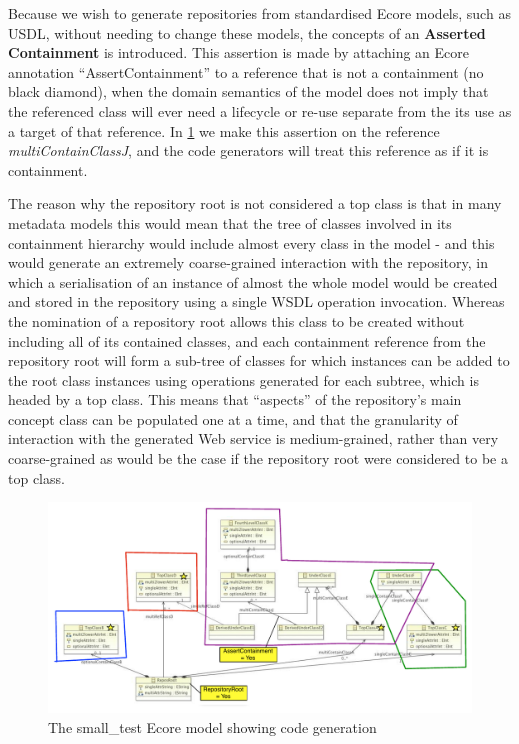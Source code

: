 \documentclass[11pt]{article}
\begin{document}
Because we wish to generate repositories from standardised Ecore models, such as USDL, without needing to change these models, the concepts of an {\bf Asserted Containment} is introduced. This assertion is made by attaching an Ecore annotation ``AssertContainment'' to a reference that is not a containment (no black diamond), when the domain semantics of the model does not imply that the referenced class will ever need a lifecycle or re-use separate from the its use as a target of that reference. In  \ref{small-test-code} we make this assertion on the reference {\em multiContainClassJ}, and the code generators will treat this reference as if it is containment.

The reason why the repository root is not considered a top class is that in many metadata models this would mean that the tree of classes involved in its containment hierarchy would include almost every class in the model - and this would generate an extremely coarse-grained interaction with the repository, in which a serialisation of an instance of almost the whole model would be created and stored in the repository using a single WSDL operation invocation. Whereas the nomination of a repository root allows this class to be created without including all of its contained classes, and each containment reference from the repository root will form a sub-tree of classes for which instances can be added to the root class instances using operations generated for each subtree, which is headed by a top class. This means that ``aspects'' of the repository's main concept class can be populated one at a time, and that the granularity of interaction with the generated Web service is medium-grained, rather than very coarse-grained as would be the case if the repository root were considered to be a top class.

\begin{figure}[htbp]
\begin{center}
\includegraphics[width=15cm]{SmallTestEcoreWithCodeGen.pdf}
\caption{The small\_test Ecore model showing code generation}
\label{small-test-code}
\end{center}
\end{figure}
\end{document}
